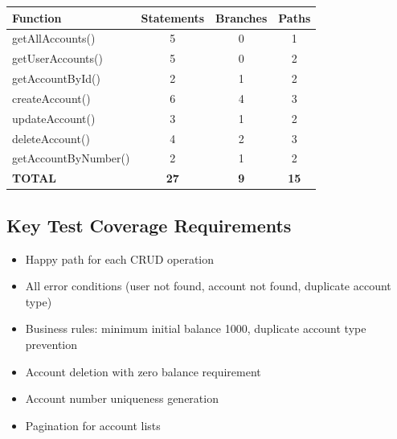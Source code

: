 \begin{longtable}{|l|c|c|c|}
\hline
\textbf{Function} & \textbf{Statements} & \textbf{Branches} & \textbf{Paths} \\
\hline
getAllAccounts() & 5 & 0 & 1 \\
\hline
getUserAccounts() & 5 & 0 & 2 \\
\hline
getAccountById() & 2 & 1 & 2 \\
\hline
createAccount() & 6 & 4 & 3 \\
\hline
updateAccount() & 3 & 1 & 2 \\
\hline
deleteAccount() & 4 & 2 & 3 \\
\hline
getAccountByNumber() & 2 & 1 & 2 \\
\hline
\textbf{TOTAL} & \textbf{27} & \textbf{9} & \textbf{15} \\
\hline
\end{longtable}

\subsection{Key Test Coverage Requirements}
\begin{itemize}
    \item Happy path for each CRUD operation
    \item All error conditions (user not found, account not found, duplicate account type)
    \item Business rules: minimum initial balance 1000, duplicate account type prevention
    \item Account deletion with zero balance requirement
    \item Account number uniqueness generation
    \item Pagination for account lists
\end{itemize}
